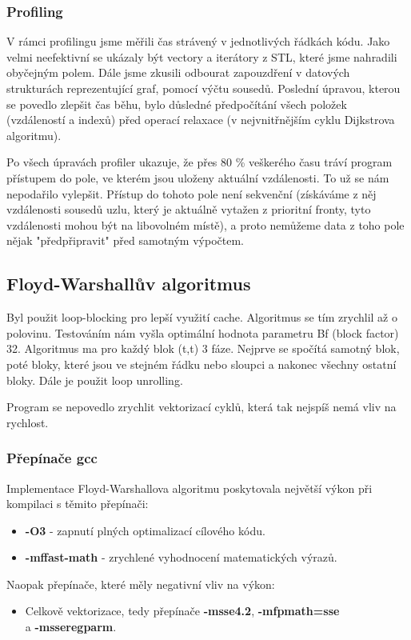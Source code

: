 \documentclass[a4paper,11pt]{article}
\begin{document}
\subsubsection{Profiling}
V rámci profilingu jsme měřili čas strávený v jednotlivých řádkách kódu. Jako velmi neefektivní se ukázaly být vectory a iterátory z STL, které jsme nahradili obyčejným polem. Dále jsme zkusili odbourat zapouzdření v datových strukturách reprezentující graf, pomocí výčtu sousedů. Poslední úpravou, kterou se povedlo zlepšit čas běhu, bylo důsledné předpočítání všech položek (vzdáleností a indexů) před operací relaxace (v nejvnitřnějším cyklu Dijk\-strova algoritmu).
\par
Po všech úpravách profiler ukazuje, že přes 80 \% veškerého času tráví program přístupem do pole, ve kterém jsou uloženy aktuální vzdálenosti. To už se nám nepodařilo vylepšit. Přístup do tohoto pole není sekvenční (získáváme z něj vzdálenosti sousedů uzlu, který je aktuálně vytažen z prioritní fronty, tyto vzdálenosti mohou být na libovolném místě), a proto nemůžeme data z toho pole nějak "předpřipravit" před samotným výpočtem.

\subsection{Floyd-Warshallův algoritmus}
Byl použit loop-blocking pro lepší využití cache. Algoritmus se tím zrychlil až o polovinu. Testováním nám vyšla optimální hodnota parametru Bf (block factor) 32. Algoritmus ma pro každý blok (t,t) 3 fáze. Nejprve se spočítá samotný blok, poté bloky, které jsou ve stejném řádku nebo sloupci a nakonec všechny ostatní bloky. Dále je použit loop unrolling. 
\par
Program se nepovedlo zrychlit vektorizací cyklů, která tak nejspíš nemá vliv na rychlost.
\subsubsection{Přepínače gcc}
Implementace Floyd-Warshallova algoritmu poskytovala největší výkon při kompilaci s těmito přepínači:
\begin{itemize}
 \item \textbf{-O3} - zapnutí plných optimalizací cílového kódu.
 \item \textbf{-mffast-math} - zrychlené vyhodnocení matematických výrazů.
\end{itemize}
Naopak přepínače, které měly negativní vliv na výkon:
\begin{itemize}
  \item Celkově vektorizace, tedy přepínače \textbf{-msse4.2}, \textbf{-mfpmath=sse} \\a \textbf{-msseregparm}.
\end{itemize}
\end{document}
